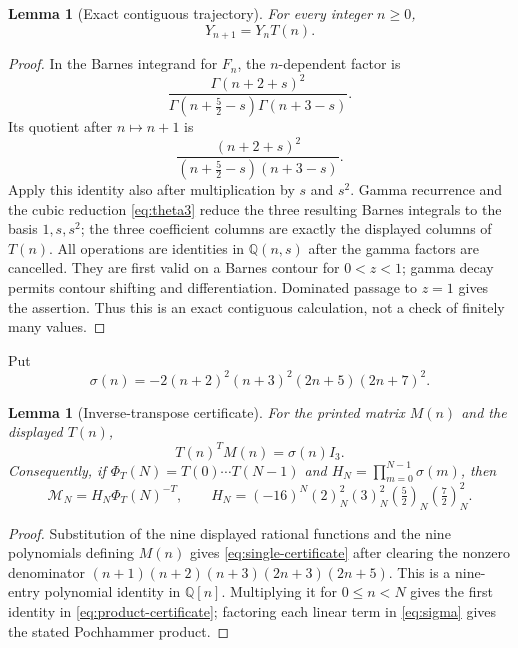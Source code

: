 \documentclass[11pt]{article}
\newtheorem{lemma}[theorem]{Lemma}
\theoremstyle{remark}
\newcommand{\Q}{\mathbb Q}
\begin{document}
\begin{lemma}[Exact contiguous trajectory]\label{lem:trajectory}
For every integer $n\geq0$,
\[
                         Y_{n+1}=Y_nT(n).
\]
\end{lemma}

\begin{proof}
In the Barnes integrand for $F_n$, the $n$-dependent factor is
\[
 \frac{\Gamma(n+2+s)^2}
      {\Gamma(n+\frac52-s)\Gamma(n+3-s)}.
\]
Its quotient after $n\mapsto n+1$ is
\[
 \frac{(n+2+s)^2}{(n+\frac52-s)(n+3-s)}.
\]
Apply this identity also after multiplication by $s$ and $s^2$.
Gamma recurrence and the cubic reduction \eqref{eq:theta3} reduce
the three resulting Barnes integrals to the basis $1,s,s^2$; the
three coefficient columns are exactly the displayed columns of
$T(n)$.  All operations are identities in $\Q(n,s)$ after the
gamma factors are cancelled.  They are first valid on a Barnes
contour for $0<z<1$; gamma decay permits contour shifting and
differentiation.  Dominated passage to $z=1$ gives the assertion.
Thus this is an exact contiguous calculation, not a check of
finitely many values.
\end{proof}

Put
\begin{equation}\label{eq:sigma}
 \sigma(n)=-2(n+2)^2(n+3)^2(2n+5)(2n+7)^2.
\end{equation}

\begin{lemma}[Inverse-transpose certificate]\label{lem:inverse-transpose}
For the printed matrix $M(n)$ and the displayed $T(n)$,
\begin{equation}\label{eq:single-certificate}
              T(n)^TM(n)=\sigma(n)I_3.
\end{equation}
Consequently, if $\Phi_T(N)=T(0)\cdots T(N-1)$ and
$H_N=\prod_{m=0}^{N-1}\sigma(m)$, then
\begin{equation}\label{eq:product-certificate}
 \mathcal M_N=H_N\Phi_T(N)^{-T},\qquad
 H_N=(-16)^N(2)_N^2(3)_N^2(\tfrac52)_N(\tfrac72)_N^2.
\end{equation}
\end{lemma}

\begin{proof}
Substitution of the nine displayed rational functions and the nine
polynomials defining $M(n)$ gives \eqref{eq:single-certificate}
after clearing the nonzero denominator
$(n+1)(n+2)(n+3)(2n+3)(2n+5)$.  This is a nine-entry polynomial
identity in $\Q[n]$.  Multiplying it for $0\leq n<N$ gives the
first identity in \eqref{eq:product-certificate}; factoring each
linear term in \eqref{eq:sigma} gives the stated Pochhammer product.
\end{proof}
\end{document}
